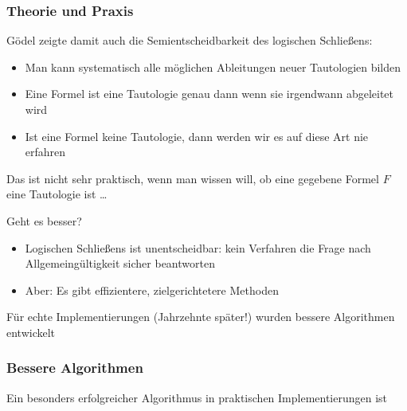 \documentclass[onlymath]{beamer}
\begin{document}
\begin{frame}\frametitle{Theorie und Praxis}

Gödel zeigte damit auch die Semientscheidbarkeit des logischen Schließens:
\begin{itemize}
\item Man kann systematisch alle möglichen Ableitungen neuer Tautologien
bilden
\item Eine Formel ist eine Tautologie genau dann wenn sie irgendwann abgeleitet wird
\item Ist eine Formel keine Tautologie, dann werden wir es auf diese Art nie erfahren
\end{itemize}\pause

Das ist nicht sehr praktisch, wenn man wissen will, ob eine gegebene Formel $F$ eine
Tautologie ist \ldots
\bigskip

\alert{Geht es besser?}\pause
\begin{itemize}
\item Logischen Schließens ist unentscheidbar: kein Verfahren die Frage nach Allgemeingültigkeit sicher beantworten
\item Aber: Es gibt effizientere, zielgerichtetere Methoden
\end{itemize}

Für echte Implementierungen (Jahrzehnte später!) wurden bessere Algorithmen entwickelt

\end{frame}

\begin{frame}\frametitle{Bessere Algorithmen}\pause

Ein besonders erfolgreicher Algorithmus in praktischen Implementierungen ist
\bigskip\pause


\end{frame}
\end{document}
